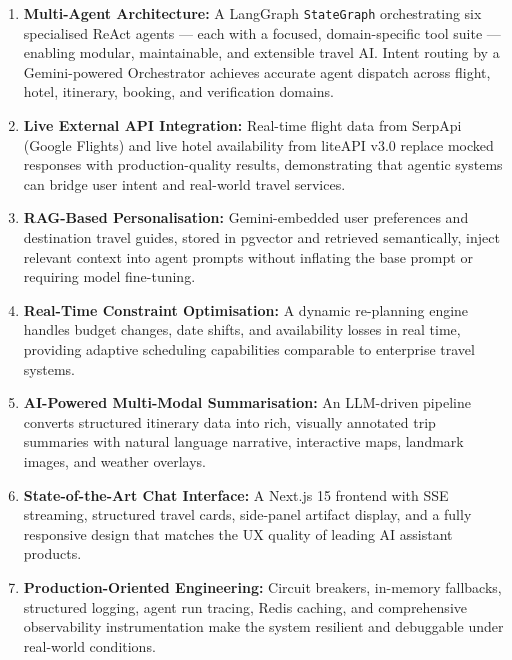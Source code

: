 \documentclass[12pt, a4paper]{article}
\begin{document}
\begin{enumerate}[leftmargin=1.5cm, itemsep=0.4em]
  \item \textbf{Multi-Agent Architecture:} A LangGraph \texttt{StateGraph} orchestrating six specialised ReAct agents --- each with a focused, domain-specific tool suite --- enabling modular, maintainable, and extensible travel AI. Intent routing by a Gemini-powered Orchestrator achieves accurate agent dispatch across flight, hotel, itinerary, booking, and verification domains.

  \item \textbf{Live External API Integration:} Real-time flight data from SerpApi (Google Flights) and live hotel availability from liteAPI v3.0 replace mocked responses with production-quality results, demonstrating that agentic systems can bridge user intent and real-world travel services.

  \item \textbf{RAG-Based Personalisation:} Gemini-embedded user preferences and destination travel guides, stored in pgvector and retrieved semantically, inject relevant context into agent prompts without inflating the base prompt or requiring model fine-tuning.

  \item \textbf{Real-Time Constraint Optimisation:} A dynamic re-planning engine handles budget changes, date shifts, and availability losses in real time, providing adaptive scheduling capabilities comparable to enterprise travel systems.

  \item \textbf{AI-Powered Multi-Modal Summarisation:} An LLM-driven pipeline converts structured itinerary data into rich, visually annotated trip summaries with natural language narrative, interactive maps, landmark images, and weather overlays.

  \item \textbf{State-of-the-Art Chat Interface:} A Next.js 15 frontend with SSE streaming, structured travel cards, side-panel artifact display, and a fully responsive design that matches the UX quality of leading AI assistant products.

  \item \textbf{Production-Oriented Engineering:} Circuit breakers, in-memory fallbacks, structured logging, agent run tracing, Redis caching, and comprehensive observability instrumentation make the system resilient and debuggable under real-world conditions.
\end{enumerate}
\end{document}
